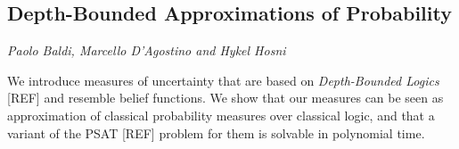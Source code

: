 \documentclass[../booklet.tex]{subfiles}
\begin{document}
\subsection[Depth-Bounded Approximations of Probability. {\it Paolo Baldi, Marcello D'Agostino and Hykel Hosni}]{Depth-Bounded Approximations of Probability}
  

\begin{center}
  {\it Paolo Baldi, Marcello D'Agostino and Hykel Hosni}
\end{center}

\vskip 0.8cm


We introduce measures of uncertainty that are based on {\em Depth-Bounded Logics} [REF] and resemble belief functions. We show that our measures can be seen as approximation of classical probability measures over classical logic, and that 
a variant of the PSAT [REF] problem for them is solvable in polynomial time. 
\end{document}
